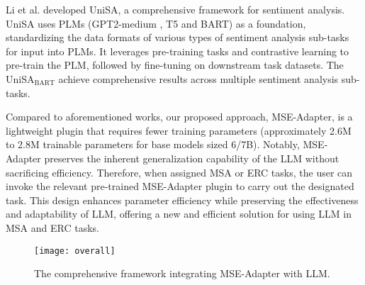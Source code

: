 	Li et al.  developed UniSA, a comprehensive framework for sentiment analysis. UniSA uses PLMs (GPT2-medium \cite{radford2019language}, T5 and BART) as a foundation, standardizing the data formats of various types of sentiment analysis sub-tasks for input into PLMs. It leverages pre-training tasks and contrastive learning to pre-train the PLM, followed by fine-tuning on downstream task datasets. The UniSA$_{\text{BART}}$ achieve comprehensive results across multiple sentiment analysis sub-tasks. 
	
	Compared to aforementioned works, our proposed approach, MSE-Adapter, is a lightweight plugin that requires fewer training parameters (approximately 2.6M to 2.8M trainable parameters for base models sized 6/7B). Notably, MSE-Adapter preserves the inherent generalization capability of the LLM without sacrificing efficiency. Therefore, when assigned MSA or ERC tasks, the user can invoke the relevant pre-trained MSE-Adapter plugin to carry out the designated task. This design enhances parameter efficiency while preserving the effectiveness and adaptability of LLM, offering a new and efficient solution for using LLM in MSA and ERC tasks.
		
	\begin{figure*}[ht]
		\centering
		\texttt{[image: overall]}
		\caption{The comprehensive framework integrating MSE-Adapter with LLM.} %
		\label{figure 1}
	\end{figure*}
	
